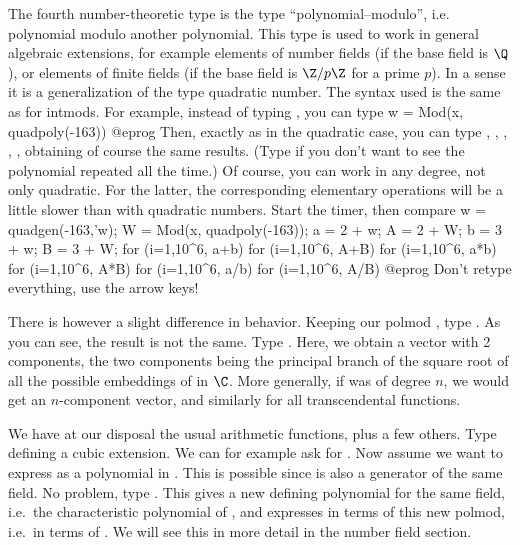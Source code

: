 The fourth number-theoretic type is the type ``polynomial--modulo'', i.e.
polynomial modulo another polynomial. This type is used to work in general
algebraic extensions, for example elements of number fields (if the base
field is $\Q$), or elements of finite fields (if the base field is
$\Z/p\Z$ for a prime $p$). In a sense it is a generalization of the type
quadratic number. The syntax used is the same as for intmods. For example,
instead of typing , you can type
\bprog
  w = Mod(x, quadpoly(-163))
@eprog\noindent
Then, exactly as in the quadratic case, you can type ,
, , , , obtaining of course the same results. (Type  if you
don't want to see the polynomial  repeated all the
time.) Of course, you can work in any degree, not only quadratic. For the
latter, the corresponding elementary operations will be a little slower than
with quadratic numbers. Start the timer, then compare
\bprog
  w = quadgen(-163,'w); W = Mod(x, quadpoly(-163));
  a = 2 + w;            A = 2 + W;
  b = 3 + w;            B = 3 + W;
  for (i=1,10^6, a+b)
  for (i=1,10^6, A+B)
  for (i=1,10^6, a*b)
  for (i=1,10^6, A*B)
  for (i=1,10^6, a/b)
  for (i=1,10^6, A/B)
@eprog\noindent
Don't retype everything, use the arrow keys!

There is however a slight difference in behavior. Keeping our polmod ,
type . As you can see, the result is not the same. Type
. Here, we obtain a vector with 2 components, the two components
being the principal branch of the square root of all the possible embeddings
of  in $\C$. More generally, if
 was of degree $n$, we would get an $n$-component vector, and similarly
for all transcendental functions.

We have at our disposal the usual arithmetic functions, plus a few others.
Type  defining a cubic extension. We can for
example ask for . Now assume we want to express 
as a polynomial in . This is possible since  is also a
generator of the same field. No problem, type . This gives
a new defining polynomial for the same field, i.e.~the characteristic
polynomial of , and expresses  in terms of this new polmod,
i.e.~in terms of . We will see this in more detail in the number
field section.

